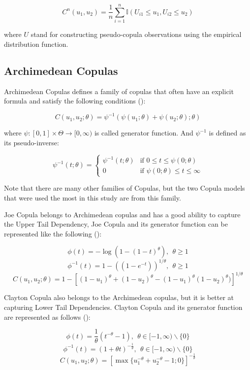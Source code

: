 \documentclass[
]{krantz}
\begin{document}
\[C^n(u_1, u_2) = \frac{1}{n} \sum_{i=1}^n \mathbb{I}\left(U_{i1} \leq u_1, U_{i2} \leq u_2\right) \tag{8} \]

where \(U\) stand for constructing pseudo-copula observations using the empirical distribution function.

\subsection{Archimedean Copulas}\label{archimedean-shiyu}

Archimedean Copulas defines a family of copulas that often have an explicit formula and satisfy the following conditions (\citet{mcneil2009}):

\[C(u_{1}, u_{2}; \theta) = \psi^{-1}\left( \psi(u_{1}; \theta) + \psi(u_{2}; \theta); \theta \right) \tag{9}\]

where \(\psi : [0,1] \times \Theta \rightarrow [0,\infty)\) is called generator function. And \(\psi^{-1}\) is defined as its pseudo-inverse:

\[\psi^{-1}(t; \theta) =
\begin{cases}
    \psi^{-1}(t; \theta) & \text{if } 0 \le t \le \psi(0; \theta) \\
    0 & \text{if } \psi(0; \theta) \le t \le \infty
\end{cases} \tag{10}\]

Note that there are many other families of Copulas, but the two Copula models that were used the most in this study are from this family.

Joe Copula belongs to Archimedean copulas and has a good ability to capture the Upper Tail Dependency, Joe Copula and its generator function can be represented like the following (\citet{triantafyllou2024}):

\[\phi(t) = -\log\left(1 - (1 - t)^\theta\right), \ \ \theta \geq 1 \tag{11}\]
\[\phi^{-1}(t) = 1 - ((1 - e^{-t}))^{1/\theta}, \ \ \theta \geq 1 \tag{12}\]
\[C(u_1, u_2; \theta) = 1 - \left[ (1 - u_1)^\theta+(1 - u_2)^\theta - (1 - u_1)^\theta(1 - u_2)^\theta)\right]^{1/\theta} \tag{13}\]

Clayton Copula also belongs to the Archimedean copulas, but it is better at capturing Lower Tail Dependencies. Clayton Copula and its generator function are represented as follows (\citet{chesneau2023}):

\[\phi(t) = \frac{1}{\theta} (t^{-\theta} - 1), \ \ \theta \in [-1, \infty) \backslash \{0\} \tag{14}\]
\[\phi^{-1}(t) = (1 + \theta t)^{-\frac{1}{\theta}}, \ \ \theta \in [-1, \infty) \backslash \{0\} \tag{15}\]
\[C(u_1, u_2; \theta) = \left[\max\{u_1^{-\theta} + u_2^{-\theta} -1;0\}\right]^{-\frac{1}{\theta}} \tag{16}\]
\end{document}

